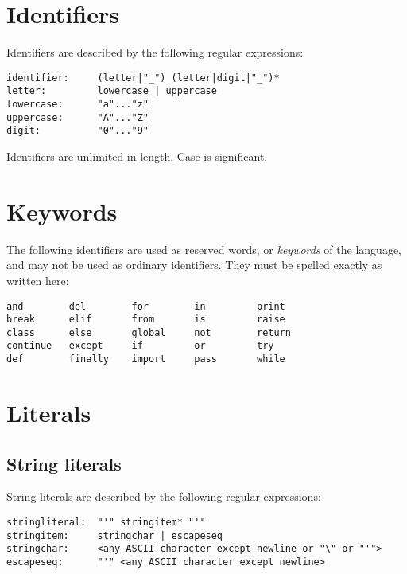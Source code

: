 \section{Identifiers}

Identifiers are described by the following regular expressions:

\begin{verbatim}
identifier:     (letter|"_") (letter|digit|"_")*
letter:         lowercase | uppercase
lowercase:      "a"..."z"
uppercase:      "A"..."Z"
digit:          "0"..."9"
\end{verbatim}

Identifiers are unlimited in length.  Case is significant.

\section{Keywords}

The following identifiers are used as reserved words, or {\em
keywords} of the language, and may not be used as ordinary
identifiers.  They must be spelled exactly as written here:

\begin{verbatim}
and        del        for        in         print
break      elif       from       is         raise
class      else       global     not        return
continue   except     if         or         try
def        finally    import     pass       while
\end{verbatim}


\section{Literals}

\subsection{String literals}

String literals are described by the following regular expressions:

\begin{verbatim}
stringliteral:  "'" stringitem* "'"
stringitem:     stringchar | escapeseq
stringchar:     <any ASCII character except newline or "\" or "'">
escapeseq:      "'" <any ASCII character except newline>
\end{verbatim}

